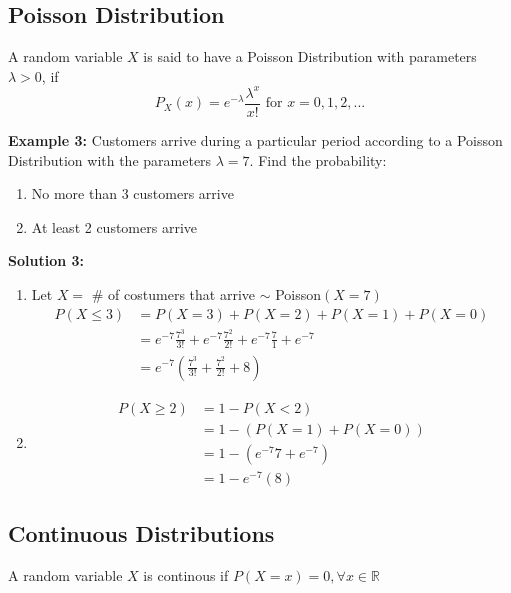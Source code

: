 \documentclass[12pt]{article}
\begin{document}
\subsection{Poisson Distribution}

\begin{tcolorbox}[title=Definition: Poisson Distribution]
	A random variable $X$ is said to have a Poisson Distribution with parameters $\lambda > 0$, if
	$$P_X (x) = e^{-\lambda} \frac{\lambda^x}{x!} \text{ for } x = 0,1,2,...$$
\end{tcolorbox}

\textbf{Example 3:} Customers arrive during a particular period according to a Poisson Distribution with the parameters $\lambda = 7$. Find the probability:
\begin{enumerate}
	\item{No more than 3 customers arrive}
	\item{At least 2 customers arrive}
\end{enumerate}

\textbf{Solution 3:}
\begin{enumerate}
	\item{
	Let $X = $ \# of costumers that arrive $\sim$ Poisson$(X = 7)$
	\begin{align*}
		P(X \leq 3) &= P(X = 3) + P(X = 2) + P(X = 1) + P(X = 0)\\
		&= e^{-7} \frac{7^3}{3!} + e^{-7} \frac{7^2}{2!} + e^{-7} \frac{7}{1} + e^{-7}\\
		&= e^{-7} (\frac{7^3}{3!} + \frac{7^2}{2!} + 8)
	\end{align*}
	}
	\item{
	\begin{align*}
		P(X \geq 2) &= 1 - P(X < 2)\\
		&= 1 - (P(X = 1) + P(X = 0))\\
		&= 1 - (e^{-7}7 + e^{-7})\\
		&= 1 - e^{-7}(8)
	\end{align*}
	}
\end{enumerate}

\subsection{Continuous Distributions}

\begin{tcolorbox}[title=Definition: Continuous Random Variables]
	A random variable $X$ is continous if $P(X = x) = 0,  \forall x \in\mathbb{R}$
\end{tcolorbox}
\end{document}
